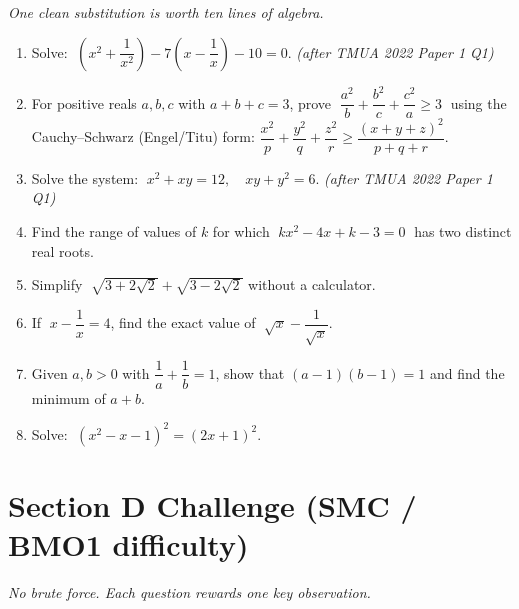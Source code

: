\documentclass[11pt,a4paper]{article}
\begin{document}
\noindent\textit{One clean substitution is worth ten lines of algebra.}

\begin{enumerate}

\item Solve: $\;\left(x^2 + \dfrac{1}{x^2}\right) - 7\!\left(x - \dfrac{1}{x}\right) - 10 = 0$. \textit{\small(after TMUA 2022 Paper 1 Q1)}

\item For positive reals $a, b, c$ with $a + b + c = 3$, prove
      $\;\dfrac{a^2}{b} + \dfrac{b^2}{c} + \dfrac{c^2}{a} \geq 3\;$
      using the Cauchy--Schwarz (Engel/Titu) form:
      $\dfrac{x^2}{p}+\dfrac{y^2}{q}+\dfrac{z^2}{r}\geq\dfrac{(x+y+z)^2}{p+q+r}$.

\item Solve the system: $\;x^2 + xy = 12,\quad xy + y^2 = 6$. \textit{\small(after TMUA 2022 Paper 1 Q1)}

\item Find the range of values of $k$ for which
      $\;kx^2 - 4x + k - 3 = 0\;$ has two distinct real roots.

\item Simplify $\;\sqrt{3 + 2\sqrt{2}} + \sqrt{3 - 2\sqrt{2}}$ without a calculator.

\item If $\;x - \dfrac{1}{x} = 4$, find the exact value of $\;\sqrt{x} - \dfrac{1}{\sqrt{x}}$.

\item Given $a, b > 0$ with $\dfrac{1}{a} + \dfrac{1}{b} = 1$, show that
      $(a-1)(b-1) = 1$ and find the minimum of $a + b$.

\item Solve: $\;(x^2 - x - 1)^2 = (2x + 1)^2$.

\end{enumerate}

\section*{Section D \quad Challenge \hfill{\normalfont\small(SMC / BMO1 difficulty)}}

\noindent\textit{No brute force. Each question rewards one key observation.}
\end{document}
